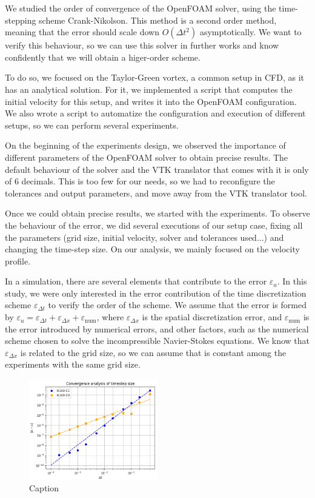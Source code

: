 
We studied the order of convergence of the OpenFOAM solver, using the time-stepping scheme Crank-Nikolson. This method is a second order method, meaning that the error should scale down $O(\Delta t^2)$ asymptotically. We want to verify this behaviour, so we can use this solver in further works and know confidently that we will obtain a higer-order scheme.

To do so, we focused on the Taylor-Green vortex, a common setup in CFD, as it has an analytical solution. For it, we implemented a script that computes the initial velocity for this setup, and writes it into the OpenFOAM configuration. We also wrote a script to automatize the configuration and execution of different setups, so we can perform several experiments.

On the beginning of the experiments design, we observed the importance of different parameters of the OpenFOAM solver to obtain precise results. The default behaviour of the solver and the VTK translator that comes with it is only of 6 decimals. This is too few for our needs, so we had to reconfigure the tolerances and output parameters, and move away from the VTK translator tool.

Once we could obtain precise results, we started with the experiments. To observe the behaviour of the error, we did several executions of our setup case, fixing all the parameters (grid size, initial velocity, solver and tolerances used...) and changing the time-step size. On our analysis, we mainly focused on the velocity profile.

In a simulation, there are several elements that contribute to the error $\varepsilon_{u}$. In this study, we were only interested in the error contribution of the time discretization scheme $\varepsilon_{\Delta t}$ to verify the order of the scheme. We assume that the error is formed by $\varepsilon_u = \varepsilon_{\Delta t} + \varepsilon_{\Delta x} + \varepsilon_\text{num}$, where $\varepsilon_{\Delta x}$ is the spatial discretization error, and $\varepsilon_\text{num}$ is the error introduced by numerical errors, and other factors, such as the numerical scheme chosen to solve the incompressible Navier-Stokes equations. We know that $\varepsilon_{\Delta x}$ is related to the grid size, so we can assume that is constant among the experiments with the same grid size.

\begin{figure}[!ht]
    \centering
    \includegraphics[width=0.5\textwidth]{resources/convergence_study_N100.PNG}
    \caption{Caption}
    \label{fig:error_x_y}
\end{figure}

